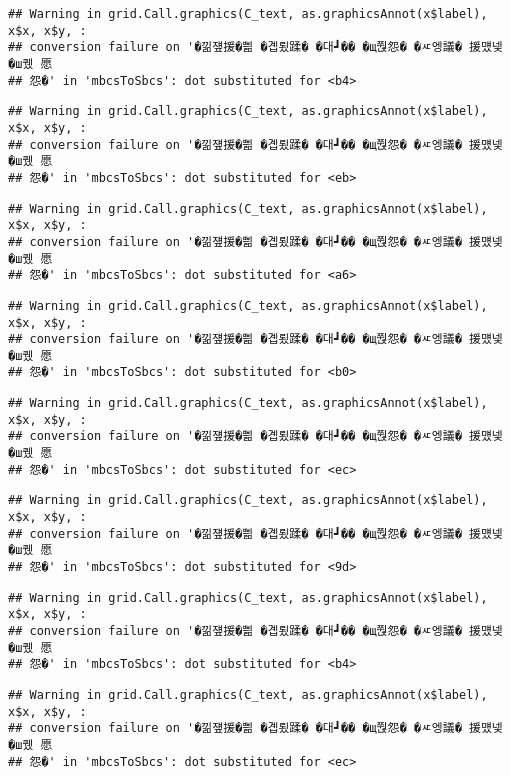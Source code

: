 \documentclass[
]{article}
\begin{document}
\begin{verbatim}
## Warning in grid.Call.graphics(C_text, as.graphicsAnnot(x$label), x$x, x$y, :
## conversion failure on '�낆쟾援�쁾 �곕룄蹂� �대┛�� �щ쭩怨� �ㅼ엥議� 援먰넻�ш퀬 愿
## 怨�' in 'mbcsToSbcs': dot substituted for <b4>
\end{verbatim}

\begin{verbatim}
## Warning in grid.Call.graphics(C_text, as.graphicsAnnot(x$label), x$x, x$y, :
## conversion failure on '�낆쟾援�쁾 �곕룄蹂� �대┛�� �щ쭩怨� �ㅼ엥議� 援먰넻�ш퀬 愿
## 怨�' in 'mbcsToSbcs': dot substituted for <eb>
\end{verbatim}

\begin{verbatim}
## Warning in grid.Call.graphics(C_text, as.graphicsAnnot(x$label), x$x, x$y, :
## conversion failure on '�낆쟾援�쁾 �곕룄蹂� �대┛�� �щ쭩怨� �ㅼ엥議� 援먰넻�ш퀬 愿
## 怨�' in 'mbcsToSbcs': dot substituted for <a6>
\end{verbatim}

\begin{verbatim}
## Warning in grid.Call.graphics(C_text, as.graphicsAnnot(x$label), x$x, x$y, :
## conversion failure on '�낆쟾援�쁾 �곕룄蹂� �대┛�� �щ쭩怨� �ㅼ엥議� 援먰넻�ш퀬 愿
## 怨�' in 'mbcsToSbcs': dot substituted for <b0>
\end{verbatim}

\begin{verbatim}
## Warning in grid.Call.graphics(C_text, as.graphicsAnnot(x$label), x$x, x$y, :
## conversion failure on '�낆쟾援�쁾 �곕룄蹂� �대┛�� �щ쭩怨� �ㅼ엥議� 援먰넻�ш퀬 愿
## 怨�' in 'mbcsToSbcs': dot substituted for <ec>
\end{verbatim}

\begin{verbatim}
## Warning in grid.Call.graphics(C_text, as.graphicsAnnot(x$label), x$x, x$y, :
## conversion failure on '�낆쟾援�쁾 �곕룄蹂� �대┛�� �щ쭩怨� �ㅼ엥議� 援먰넻�ш퀬 愿
## 怨�' in 'mbcsToSbcs': dot substituted for <9d>
\end{verbatim}

\begin{verbatim}
## Warning in grid.Call.graphics(C_text, as.graphicsAnnot(x$label), x$x, x$y, :
## conversion failure on '�낆쟾援�쁾 �곕룄蹂� �대┛�� �щ쭩怨� �ㅼ엥議� 援먰넻�ш퀬 愿
## 怨�' in 'mbcsToSbcs': dot substituted for <b4>
\end{verbatim}

\begin{verbatim}
## Warning in grid.Call.graphics(C_text, as.graphicsAnnot(x$label), x$x, x$y, :
## conversion failure on '�낆쟾援�쁾 �곕룄蹂� �대┛�� �щ쭩怨� �ㅼ엥議� 援먰넻�ш퀬 愿
## 怨�' in 'mbcsToSbcs': dot substituted for <ec>
\end{verbatim}
\end{document}
